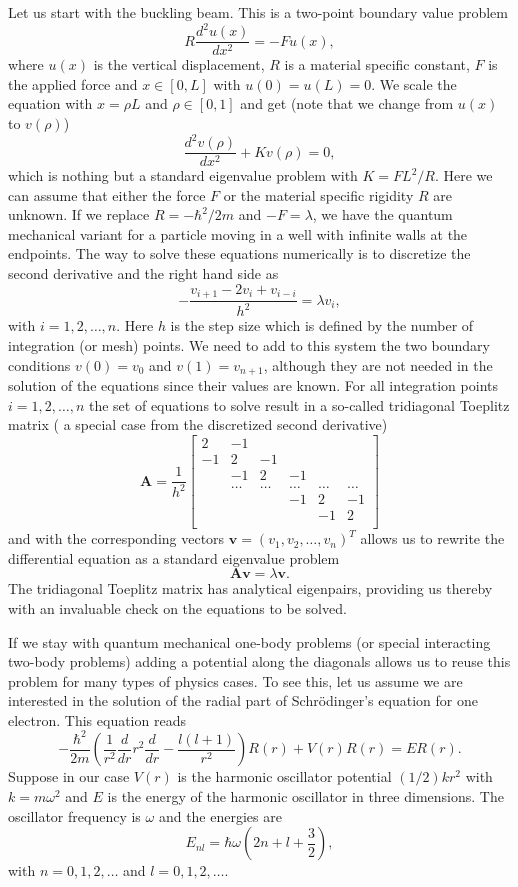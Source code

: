 \documentclass[graybox,envcountchap,sectrefs]{svmult}
\begin{document}
Let us start with the buckling beam. This is a two-point boundary
value problem
\[
R \frac{d^2 u(x)}{dx^2} = -F u(x),
\]
where $u(x)$ is the vertical displacement, $R$ is a material specific
constant, $F$ is the applied force and $x \in [0,L]$ with $u(0)=u(L)=0$.
We scale the equation with $x = \rho L$ and $\rho \in [0,1]$ and get
(note that we change from $u(x)$ to $v(\rho)$)
\[
\frac{d^2 v(\rho)}{dx^2} +K v(\rho)=0,
\]
which is nothing but a standard eigenvalue problem with $K=
FL^2/R$. Here we can assume that either the force $F$ or the material
specific rigidity $R$ are unknown.  If we replace $R=-\hbar^2/2m$ and
$-F=\lambda$, we have the quantum mechanical variant for a particle
moving in a well with infinite walls at the endpoints.  The way to
solve these equations numerically is to discretize the second
derivative and the right hand side as
\[
    -\frac{v_{i+1} -2v_i +v_{i-i}}{h^2}=\lambda v_i,
\]
with $i=1,2,\dots, n$. Here $h$ is the step size which is defined by
the number of integration (or mesh) points.  We need to add to this
system the two boundary conditions $v(0) =v_0$ and $v(1) = v_{n+1}$,
although they are not needed in the solution of the equations since
their values are known.  For all integration points $i=1,2,\dots, n$
the set of equations to solve result in a so-called tridiagonal
Toeplitz matrix ( a special case from the discretized second
derivative)
\[
    \mathbf{A} = \frac{1}{h^2}\begin{bmatrix}
                          2 & -1 &  &   &  & \\
                          -1 & 2 & -1 & & & \\
                           & -1 & 2 & -1 & &  \\
                           & \dots   & \dots &\dots   &\dots & \dots \\
                           &   &  &-1  &2& -1 \\
                           &    &  &   &-1 & 2 \\
                      \end{bmatrix}
\]
and with the corresponding vectors $\mathbf{v} = (v_1, v_2,
\dots,v_n)^T$ allows us to rewrite the differential equation as a
standard eigenvalue problem
\[
   \mathbf{A}\mathbf{v} = \lambda\mathbf{v}.
\]
The tridiagonal Toeplitz matrix has analytical eigenpairs,
providing us thereby with an invaluable check on the equations to be
solved.

If we stay with quantum mechanical one-body problems (or
special interacting two-body problems) adding a potential along the
diagonals allows us to reuse this problem for many types of physics
cases.  To see this, let us assume we are interested in the solution
of the radial part of Schr\"odinger's equation for one electron. This
equation reads
\[
  -\frac{\hbar^2}{2 m} \left ( \frac{1}{r^2} \frac{d}{dr} r^2
  \frac{d}{dr} - \frac{l (l + 1)}{r^2} \right )R(r)
     + V(r) R(r) = E R(r).
\]
Suppose in our case $V(r)$ is the harmonic oscillator potential
$(1/2)kr^2$ with $k=m\omega^2$ and $E$ is the energy of the harmonic
oscillator in three dimensions.  The oscillator frequency is $\omega$
and the energies are
\[
E_{nl}=  \hbar \omega \left(2n+l+\frac{3}{2}\right),
\]
with $n=0,1,2,\dots$ and $l=0,1,2,\dots$.
\end{document}
